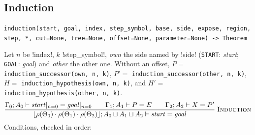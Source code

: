 \subsection{Induction}

\begin{signature}
\texttt{induction(\allowbreak{}start,\allowbreak{} goal,\allowbreak{} index,\allowbreak{} step\_\allowbreak{}symbol,\allowbreak{} base,\allowbreak{} side,\allowbreak{} expose,\allowbreak{} region,\allowbreak{} step,\allowbreak{} *,\allowbreak{} cut=None,\allowbreak{} tree=None,\allowbreak{} offset=None,\allowbreak{} parameter=None) -> Theorem}
\end{signature}

Let $n$ be \code!index!, $k$ \code!step_symbol!, \textit{own} the side named by \code!side! (\texttt{START}: \textit{start}; \texttt{GOAL}: \textit{goal}) and \textit{other} the other one. Without an offset, $P=$ \texttt{induction\_\allowbreak{}successor(\allowbreak{}own,\allowbreak{} n,\allowbreak{} k)}, $P'=$ \texttt{induction\_\allowbreak{}successor(\allowbreak{}other,\allowbreak{} n,\allowbreak{} k)}, $H=$ \texttt{induction\_\allowbreak{}hypothesis(\allowbreak{}own,\allowbreak{} n,\allowbreak{} k)}, and $H'=$ \texttt{induction\_\allowbreak{}hypothesis(\allowbreak{}other,\allowbreak{} n,\allowbreak{} k)}.
\[
\frac{\Gamma_0;A_0\vdash \mathit{start}|_{n=0}=\mathit{goal}|_{n=0}
\qquad \Gamma_1;A_1\vdash P=E
\qquad \Gamma_2;A_2\vdash X=P'}
{\lfloor\rho(\Theta_0)\cdot\rho(\Theta_1)\cdot\rho(\Theta_2)\rfloor;A_0\sqcup A_1\sqcup A_2\vdash \mathit{start}=\mathit{goal}}\;\textsc{Induction}
\]
Conditions, checked in order:
